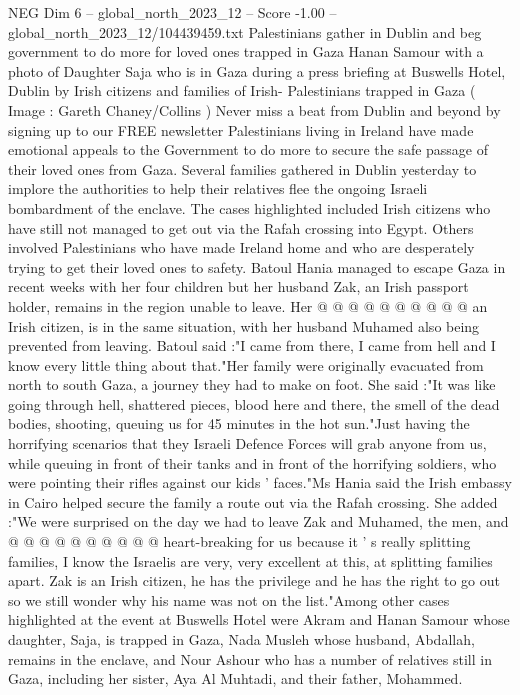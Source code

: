 \begin{textsample}{NEG Dim 6 – global\_north\_2023\_12 – Score -1.00 – global\_north\_2023\_12/104439459.txt}  \label{ex:f6_neg_257}
Palestinians gather in Dublin and beg government to do more for loved ones trapped in Gaza Hanan Samour with a photo of Daughter Saja who is in Gaza during a press briefing at Buswells Hotel, Dublin by Irish citizens and families of Irish- Palestinians trapped in Gaza ( Image : Gareth Chaney/Collins ) Never miss a beat from Dublin and beyond by signing up to our FREE newsletter Palestinians living in Ireland have made emotional appeals to the Government to do more to secure the safe passage of their loved ones from Gaza.
Several families gathered in Dublin yesterday to implore the authorities to help their relatives flee the ongoing Israeli bombardment of the enclave.
The cases highlighted included Irish citizens who have still not managed to get out via the Rafah crossing into Egypt.
Others involved Palestinians who have made Ireland home and who are desperately trying to get their loved ones to safety.
Batoul Hania managed to escape Gaza in recent weeks with her four children but her husband Zak, an Irish passport holder, remains in the region unable to leave.
Her @ @ @ @ @ @ @ @ @ @ an Irish citizen, is in the same situation, with her husband Muhamed also being prevented from leaving.
Batoul said :"I came from there, I came from hell and I know every little thing about that."Her family were originally evacuated from north to south Gaza, a journey they had to make on foot.
She said :"It was like going through hell, shattered pieces, blood here and there, the smell of the dead bodies, shooting, queuing us for 45 minutes in the hot sun."Just having the horrifying scenarios that they Israeli Defence Forces will grab anyone from us, while queuing in front of their tanks and in front of the horrifying soldiers, who were pointing their rifles against our kids ' faces."Ms Hania said the Irish embassy in Cairo helped secure the family a route out via the Rafah crossing.
She added :"We were surprised on the day we had to leave Zak and Muhamed, the men, and @ @ @ @ @ @ @ @ @ @ heart-breaking for us because it ' s really splitting families, I know the Israelis are very, very excellent at this, at splitting families apart.
Zak is an Irish citizen, he has the privilege and he has the right to go out so we still wonder why his name was not on the list."Among other cases highlighted at the event at Buswells Hotel were Akram and Hanan Samour whose daughter, Saja, is trapped in Gaza, Nada Musleh whose husband, Abdallah, remains in the enclave, and Nour Ashour who has a number of relatives still in Gaza, including her sister, Aya Al Muhtadi, and their father, Mohammed.

\end{textsample}
